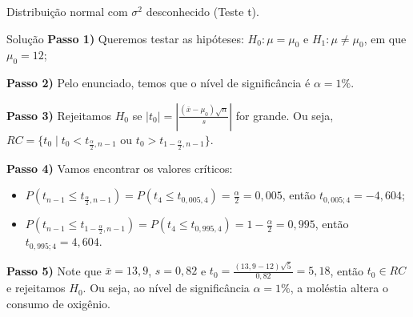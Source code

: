 \documentclass[8pt]{beamer}
\begin{document}
\begin{frame}{Distribuição normal com $\sigma^2$ desconhecido (Teste t).}

\begin{block}{Solução}
	\textbf{Passo 1)} Queremos testar as hipóteses: $H_0: \mu = \mu_0$ e $H_1: \mu \neq \mu_0$, em que $\mu_0=12$;
	
	\textbf{Passo 2)} Pelo enunciado, temos que o nível de significância é $\alpha=1\%$.
	
	\textbf{Passo 3)} Rejeitamos $H_0$ se $\lvert t_0 \rvert = \left\lvert \frac{(\bar{x} - \mu_0)\sqrt{n}}{s} \right\rvert$ for grande. Ou seja, $RC = \{ t_0 \mid t_0 < t_{\frac{\alpha}{2}, n-1} \mbox{ ou } t_0 > t_{1-\frac{\alpha}{2}, n-1} \}.$
	
	\textbf{Passo 4)} Vamos encontrar os valores críticos:
	\begin{itemize}
		\item $P\left( t_{n-1} \leq t_{\frac{\alpha}{2}, n-1} \right) = P\left( t_{4} \leq t_{0,005,4} \right) = \frac{\alpha}{2} = 0,005$, então $t_{0,005; 4} = -4,604$;
		\item $P\left( t_{n-1} \leq t_{1-\frac{\alpha}{2}, n-1} \right) = P\left( t_{4} \leq t_{0,995, 4} \right) = 1-\frac{\alpha}{2} = 0,995$, então $t_{0,995; 4} = 4,604$.
	\end{itemize}

	\textbf{Passo 5)} Note que $\bar{x} = 13,9$, $s = 0,82$ e $t_0 = \frac{(13,9 - 12)\sqrt{5}}{0,82} = 5,18$, então $t_0 \in RC$ e rejeitamos $H_0$. Ou seja, ao nível de significância $\alpha=1\%$, a moléstia altera o consumo de oxigênio.
\end{block}

\end{frame}
\end{document}
